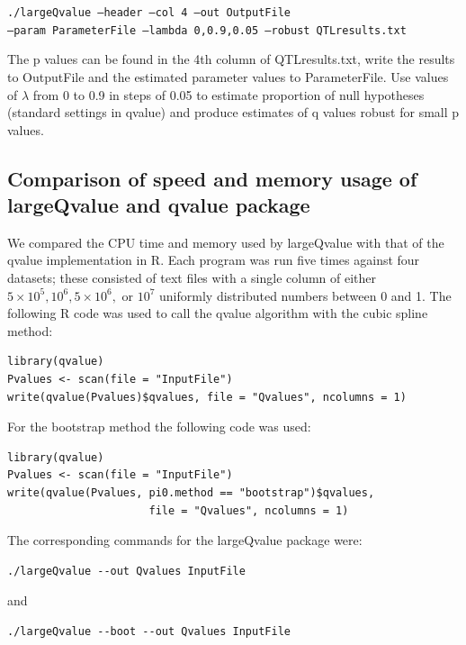 \documentclass{amsart}
\begin{document}
\texttt{./largeQvalue --header --col 4 --out OutputFile\\ 
--param ParameterFile --lambda 0,0.9,0.05 --robust QTLresults.txt}

The p values can be found in the 4th column of QTLresults.txt, write the results to OutputFile and the estimated parameter values to ParameterFile. Use values of $\lambda$ from 0 to 0.9 in steps of 0.05 to estimate proportion of null hypotheses (standard settings in qvalue) and produce estimates of q values robust for small p values.

\subsection{Comparison of speed and memory usage of largeQvalue and qvalue package}
\label{sec:compare}

We compared the CPU time and memory used by largeQvalue with that of the qvalue implementation in R. Each program was run five times against four datasets; these consisted of text files with a single column of either $5\times10^5, 10^6, 5\times10^6,$ or $10^7$ uniformly distributed numbers between 0 and 1. The following R code was used to call the qvalue algorithm with the cubic spline method:

\begin{verbatim}
library(qvalue)
Pvalues <- scan(file = "InputFile")
write(qvalue(Pvalues)$qvalues, file = "Qvalues", ncolumns = 1)
\end{verbatim}

\noindent For the bootstrap method the following code was used:

\begin{verbatim}
library(qvalue)
Pvalues <- scan(file = "InputFile")
write(qvalue(Pvalues, pi0.method == "bootstrap")$qvalues,
                      file = "Qvalues", ncolumns = 1)
\end{verbatim}

\noindent The corresponding commands for the largeQvalue package were:

\begin{verbatim}
./largeQvalue --out Qvalues InputFile
\end{verbatim}

\noindent and

\begin{verbatim}
./largeQvalue --boot --out Qvalues InputFile
\end{verbatim}

\clearpage
\end{document}
